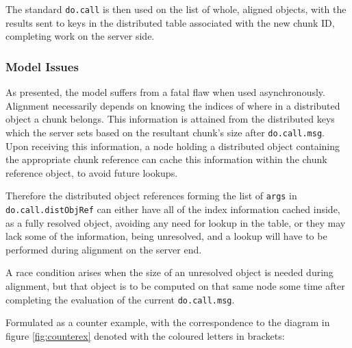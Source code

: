 The standard \texttt{do.call} is then used on the list of whole,
aligned objects, with the results sent to keys in the distributed table
associated with the new chunk ID, completing work on the server side.

\subsubsection{Model Issues}

As presented, the model suffers from a fatal flaw when used asynchronously.
Alignment necessarily depends on knowing the indices of where in a distributed
object a chunk belongs.
This information is attained from the distributed keys which the server sets
based on the resultant chunk's size after \texttt{do.call.msg}.
Upon receiving this information, a node holding a distributed object containing
the appropriate chunk reference can cache this information within the chunk
reference object, to avoid future lookups.

Therefore the distributed object references forming the list of \texttt{args}
in \texttt{do.call.distObjRef} can either have all of the index
information cached inside, as a fully resolved object, avoiding any need for
lookup in the table, or they may lack some of the information, being
unresolved, and a lookup will have to be performed during alignment on the
server end.

A race condition arises when the size of an unresolved object is needed during
alignment, but that object is to be computed on that same node some time after
completing the evaluation of the current \texttt{do.call.msg}. 


Formulated as a counter example, with the correspondence to the diagram in
figure \ref{fig:counterex} denoted with the coloured letters in brackets:

